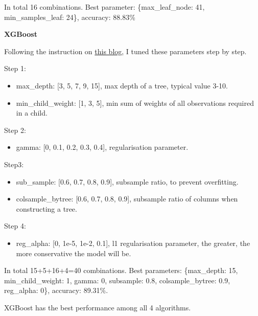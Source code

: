 \documentclass[12pt]{article}
\begin{document}
In total 16 combinations. Best parameter: \{max\_leaf\_node: 41, min\_samples\_leaf: 24\}, accuracy: 88.83\%

\textbf{XGBoost}

Following the instruction on \href{https://www.analyticsvidhya.com/blog/2016/03/complete-guide-parameter-tuning-xgboost-with-codes-python/}{this blog}, I tuned these parameters step by step.

Step 1:
\begin{itemize}
    \item max\_depth: [3, 5, 7, 9, 15], max depth of a tree, typical value 3-10.
    \item min\_child\_weight: [1, 3, 5], min sum of weights of all observations required in a child.
\end{itemize}

Step 2:
\begin{itemize}
    \item gamma: [0, 0.1, 0.2, 0.3, 0.4], regularisation parameter.
\end{itemize}

Step3:
\begin{itemize}
    \item sub\_sample: [0.6, 0.7, 0.8, 0.9], subsample ratio, to prevent overfitting.
    \item colsample\_bytree: [0.6, 0.7, 0.8, 0.9], subsample ratio of columns when constructing a tree.
\end{itemize}

Step 4:
\begin{itemize}
    \item reg\_alpha: [0, 1e-5, 1e-2, 0.1], l1 regularisation parameter, the greater, the more conservative the model will be.
\end{itemize}

In total 15+5+16+4=40 combinations. Best parameters: \{max\_depth: 15, min\_child\_weight: 1, gamma: 0, subsample: 0.8, colsample\_bytree: 0.9, reg\_alpha: 0\}, accuracy: 89.31\%.

XGBoost has the best performance among all 4 algorithms.
\end{document}
